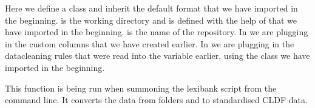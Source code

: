 \documentclass[letterpaper,10pt,english]{sphinxmanual}
\begin{document}
\begin{sphinxVerbatim}[commandchars=\\\{\}]
 
      
      

       
      
\end{sphinxVerbatim}

\sphinxAtStartPar
Here we define a class and inherit the default format  that we
have imported in the beginning.  is the working directory and is
defined with the help of  that we have imported in the beginning.
 is the name of the repository. In  we are plugging in
the custom columns that we have created earlier. In  we are
plugging in the data\sphinxhyphen{}cleaning rules that were read into the  variable
earlier, using the  class we have imported in the beginning.

\begin{sphinxVerbatim}[commandchars=\\\{\}]
  
\end{sphinxVerbatim}

\sphinxAtStartPar
This function is being run when summoning the lexibank script from the command
line. It converts the data from folders  and  to standardised
CLDF data.
\end{document}
